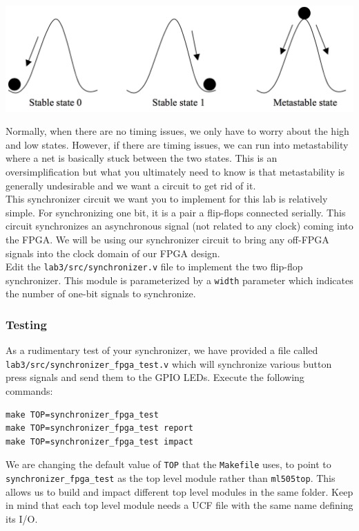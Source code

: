 \documentclass[11pt]{article}
\begin{document}
\begin{center}
\includegraphics[width=\textwidth]{images/lab2_fig3.png}
\end{center}

Normally, when there are no timing issues, we only have to worry about the high and low states. However, if there are timing issues, we can run into metastability where a net is basically stuck between the two states. This is an oversimplification but what you ultimately need to know is that metastability is generally undesirable and we want a circuit to get rid of it. \\

This synchronizer circuit we want you to implement for this lab is relatively simple. For synchronizing one bit, it is a pair a flip-flops connected serially. This circuit synchronizes an asynchronous signal (not related to any clock) coming into the FPGA. We will be using our synchronizer circuit to bring any off-FPGA signals into the clock domain of our FPGA design.\\

Edit the \verb|lab3/src/synchronizer.v| file to implement the two flip-flop synchronizer. This module is parameterized by a \verb|width| parameter which indicates the number of one-bit signals to synchronize.

\subsubsection{Testing}
As a rudimentary test of your synchronizer, we have provided a file called \verb|lab3/src/synchronizer_fpga_test.v| which will synchronize various button press signals and send them to the GPIO LEDs. Execute the following commands:

\begin{verbatim}
make TOP=synchronizer_fpga_test
make TOP=synchronizer_fpga_test report
make TOP=synchronizer_fpga_test impact
\end{verbatim} 

We are changing the default value of \verb|TOP| that the \verb|Makefile| uses, to point to \verb|synchronizer_fpga_test| as the top level module rather than \verb|ml505top|. This allows us to build and impact different top level modules in the same folder. Keep in mind that each top level module needs a UCF file with the same name defining its I/O.
\end{document}
